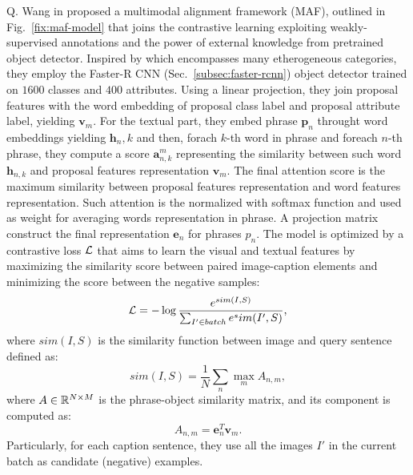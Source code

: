 Q. Wang \etal{} in \cite{wang2020maf} proposed a multimodal alignment
framework (MAF), outlined in Fig.~\ref{fix:maf-model} that joins the
contrastive learning exploiting weakly-supervised annotations and the
power of external knowledge from pretrained object detector. Inspired
by \cite{wang2019phrase} which encompasses many etherogeneous
categories, they employ the Faster-R CNN
(Sec.~\ref{subsec:faster-rcnn}) object detector trained on $1600$
classes and $400$ attributes. Using a linear projection, they join
proposal features with the word embedding of proposal class label and
proposal attribute label, yielding $\bm{v}_m$. For the textual part,
they embed phrase $\bm{p}_n$ throught word embeddings yielding
$\bm{h}_n,k$ and then, forach $k$-th word in phrase and foreach $n$-th
phrase, they compute a score $\bm{a}^m_{n,k}$ representing the
similarity between such word $\bm{h}_{n,k}$ and proposal features
representation $\bm{v}_m$. The final attention score is the maximum
similarity between proposal features representation and word features
representation. Such attention is the normalized with softmax function
and used as weight for averaging words representation in phrase. A
projection matrix construct the final representation $\bm{e}_n$ for
phrases $p_n$. The model is optimized by a contrastive loss $\mathcal{L}$
that aims to learn the visual and textual features by maximizing the
similarity score between paired image-caption elements and minimizing
the score between the negative samples:
\begin{equation}
  \mathcal{L} = - \log \frac{e^{sim(I, S)}}{ \sum_{I' \in batch} e^sim(I', S) },
\end{equation}
where $sim(I, S)$ is the similarity function between image and query
sentence defined as:
\begin{equation}
  sim(I, S) = \frac{1}{N} \sum_n \max_m A_{n,m},
\end{equation}
where $A \in \mathbb{R}^{N \times M}$ is the phrase-object similarity
matrix, and its component is computed as:
\begin{equation}
  A_{n,m} = \bm{e}^T_n \bm{v}_m.
\end{equation}
Particularly, for each caption sentence, they use all the images $I′$
in the current batch as candidate (negative) examples.

